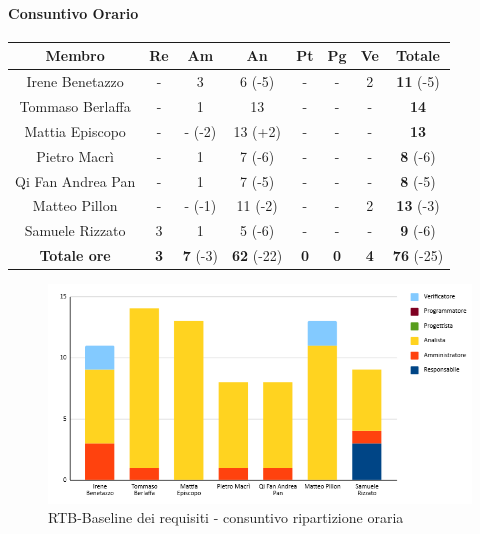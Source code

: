 \paragraph{Consuntivo Orario}
\begin{center}
	\renewcommand{\arraystretch}{1.8}
	\begin{tabular}{ |c|c|c|c|c|c|c|c| }
	\hline
	\textbf{Membro} & \textbf{Re} & \textbf{Am} &  \textbf{An} &  \textbf{Pt} &  \textbf{Pg} &  \textbf{Ve} &  \textbf{Totale}\\
    \hline
    Irene Benetazzo   & - & 3      & 6  (-5) & - & - & 2 & \textbf{11} (-5) \\
    \hline
    Tommaso Berlaffa  & - & 1      & 13      & - & - & - & \textbf{14}      \\
    \hline
    Mattia Episcopo   & - & - (-2) & 13 (+2) & - & - & - & \textbf{13}      \\
    \hline
    Pietro Macrì      & - & 1      & 7  (-6) & - & - & - & \textbf{8} (-6)  \\
    \hline
    Qi Fan Andrea Pan & - & 1      & 7  (-5) & - & - & - & \textbf{8} (-5)  \\
    \hline
    Matteo Pillon     & - & - (-1) & 11 (-2) & - & - & 2 & \textbf{13} (-3) \\
    \hline
    Samuele Rizzato   & 3 & 1      & 5  (-6) & - & - & - & \textbf{9} (-6)  \\
    \hline
    \textbf{Totale ore} & \textbf{3} & \textbf{7} (-3) &  \textbf{62} (-22) &  \textbf{0} &  \textbf{0} &  \textbf{4} &  \textbf{76} (-25)\\
    \hline
	\end{tabular}
\end{center}
\begin{figure}[H]
    \centering\includegraphics[width=\textwidth, height=\textheight,keepaspectratio]{images/consuntivo/RTB-requisiti-ore.png}
    \caption{RTB-Baseline dei requisiti - consuntivo ripartizione oraria}
\end{figure}

